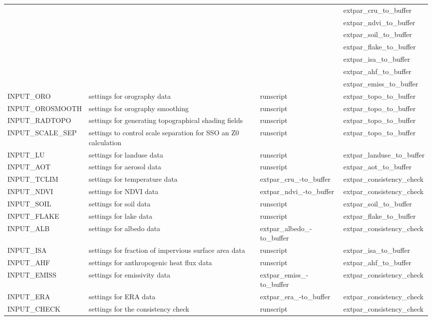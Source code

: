 \documentclass[a4paper,10pt,DIV14,BCOR1cm,titlepage,twoside]{scrartcl}
\providecommand{\tabularnewline}{\\}
\begin{document}
\begin{longtable}{|p{3.5cm}|p{4.8cm}|p{2.4cm}|p{3.8cm}|}
 & & & extpar\_cru\_to\_buffer \\ 
 & & & extpar\_ndvi\_to\_buffer \\
 & & & extpar\_soil\_to\_buffer \\
 & & & extpar\_flake\_to\_buffer \\
 & & & extpar\_isa\_to\_buffer \\
 & & & extpar\_ahf\_to\_buffer \\
 & & & extpar\_emiss\_to\_buffer \\
\hline 
 INPUT\_ORO & settings for orography data & runscript & extpar\_topo\_to\_buffer \\
\hline
 INPUT\_OROSMOOTH & settings for orography smoothing & runscript & extpar\_topo\_to\_buffer \\
\hline 
 INPUT\_RADTOPO & settings for generating topographical shading fields & runscript & extpar\_topo\_to\_buffer \\
\hline 
 INPUT\_SCALE\_SEP & settings to control scale separation for SSO an Z0 calculation & runscript & extpar\_topo\_to\_buffer \\
\hline 
 INPUT\_LU & settings for landuse data & runscript &  extpar\_landuse\_to\_buffer \\
\hline 
 INPUT\_AOT & settings for aerosol data  & runscript &  extpar\_aot\_to\_buffer \\
\hline
  INPUT\_TCLIM  & settings for temperature data     &  extpar\_cru\_-to\_buffer & extpar\_consistency\_check \tabularnewline
\hline 
INPUT\_NDVI & settings for NDVI data & extpar\_ndvi\_-to\_buffer & extpar\_consistency\_check \tabularnewline
\hline 
INPUT\_SOIL & settings for soil data & runscript & extpar\_soil\_to\_buffer \\
\hline 
INPUT\_FLAKE & settings for lake data & runscript & extpar\_flake\_to\_buffer \\
\hline
INPUT\_ALB & settings for albedo data & extpar\_albedo\_-to\_buffer & extpar\_consistency\_check \tabularnewline
\hline
INPUT\_ISA & settings for fraction of impervious surface area data & runscript & extpar\_isa\_to\_buffer \\
\hline
INPUT\_AHF & settings for anthropogenic heat flux data & runscript & extpar\_ahf\_to\_buffer \\
\hline
INPUT\_EMISS & settings for emissivity data & extpar\_emiss\_-to\_buffer & extpar\_consistency\_check \tabularnewline
\hline
INPUT\_ERA & settings for ERA data & extpar\_era\_-to\_buffer & extpar\_consistency\_check \tabularnewline
\hline
INPUT\_CHECK & settings for the consistency check & runscript & extpar\_consistency\_check \\
\hline 
\bottomrule
\end{longtable}
\end{document}
